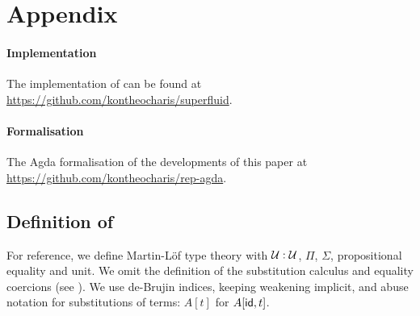 \clearpage
\section{Appendix}

\allowdisplaybreaks

\paragraph{Implementation}

The implementation of \superfluid can be found at \url{https://github.com/kontheocharis/superfluid}.

\paragraph{Formalisation} \label{app:formalisation}

The Agda formalisation of the developments of this paper at \url{https://github.com/kontheocharis/rep-agda}.

\subsection{Definition of \lambdamltt}

For reference, we define Martin-Löf type theory with $\mathcal{U} :
	\mathcal{U}$, $\Pi$, $\Sigma$, propositional equality and unit. We omit the
definition of the substitution calculus and equality coercions
(see \cite[5.1.2]{Castellan2019-qo}). We use de-Brujin indices, keeping weakening
implicit, and abuse notation for substitutions of terms: $A[t]$ for $A[\textsf{id},
			t]$.

\newcommand{\refl}{\mta{refl}}
\newcommand{\fst}{\mta{fst}}
\newcommand{\snd}{\mta{snd}}
\newcommand{\pair}{\mta{pair}}
\newcommand{\app}{\mta{app}}
\newcommand{\lam}{\mta{lam}}
\newcommand{\J}{\mta{J}}


